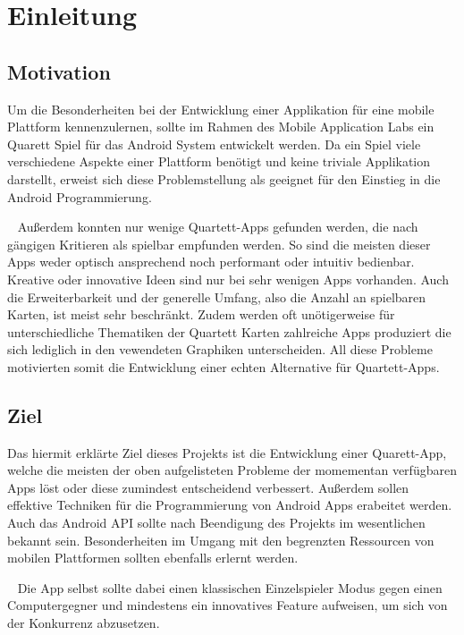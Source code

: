 \documentclass{scrartcl}
\begin{document}
\section{Einleitung}
\subsection{Motivation}

Um die Besonderheiten bei der Entwicklung einer Applikation für eine mobile
Plattform kennenzulernen, sollte im Rahmen des Mobile Application Labs ein
Quarett Spiel für das Android System entwickelt werden. Da ein Spiel viele
verschiedene Aspekte einer Plattform benötigt und keine triviale Applikation
darstellt, erweist sich diese Problemstellung als geeignet für den Einstieg in
die Android Programmierung.

\ \newline
Außerdem konnten nur wenige Quartett-Apps gefunden werden, die nach gängigen
Kritieren als spielbar empfunden werden. So sind die meisten dieser Apps weder
optisch ansprechend noch performant oder intuitiv bedienbar. Kreative oder
innovative Ideen sind nur bei sehr wenigen Apps vorhanden. Auch die
Erweiterbarkeit und der generelle Umfang, also die Anzahl an spielbaren Karten,
ist meist sehr beschränkt. Zudem werden oft unötigerweise für unterschiedliche
Thematiken der Quartett Karten zahlreiche Apps produziert die sich lediglich
in den vewendeten Graphiken unterscheiden. All diese Probleme motivierten somit
die Entwicklung einer echten Alternative für Quartett-Apps.

\subsection{Ziel}

Das hiermit erklärte Ziel dieses Projekts ist die Entwicklung einer Quarett-App,
welche die meisten der oben aufgelisteten Probleme der momementan verfügbaren
Apps löst oder diese zumindest entscheidend verbessert. Außerdem sollen
effektive Techniken für die Programmierung von Android Apps erabeitet werden.
Auch das Android API sollte nach Beendigung des Projekts im wesentlichen bekannt
sein. Besonderheiten im Umgang mit den begrenzten Ressourcen von mobilen
Plattformen sollten ebenfalls erlernt werden.

\ \newline
Die App selbst sollte dabei einen klassischen Einzelspieler Modus gegen einen
Computergegner und mindestens ein innovatives Feature aufweisen, um sich von der
Konkurrenz abzusetzen.
\end{document}
